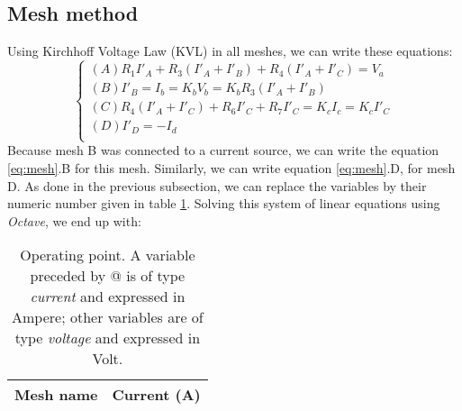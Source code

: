 \subsection{Mesh method}
Using Kirchhoff Voltage Law (KVL) in all meshes, we can write these equations:
\begin{equation}\label{eq:mesh}
\begin{cases}
  (A) R_1I'_A + R_3(I'_A + I'_B) + R_4(I'_A + I'_C) = V_a \\
  (B) I'_B = I_b = K_bV_b = K_bR_3(I'_A + I'_B) \\
  (C) R_4(I'_A+I'_C) + R_6I'_C + R_7I'_C = K_cI_c = K_cI'_C \\
  (D) I'_D = -I_d \\
\end{cases}
\end{equation}
Because mesh B was connected to a current source, we can write the equation \ref{eq:mesh}.B for this mesh. Similarly, we can write equation \ref{eq:mesh}.D, for mesh D. As done in the previous subsection, we can replace the variables by their numeric number given in table \ref{tab:mesh}. Solving this system of linear equations using \textit{Octave}, we end up with:
\begin{table}[h]
  \centering
  \begin{tabular}{|l|r|}
    \hline
        {\bf Mesh name} & {\bf Current (A)} \\ \hline
        
  \end{tabular}
  \caption{Operating point. A variable preceded by @ is of type {\em current}
   and expressed in Ampere; other variables are of type {\it voltage} and expressed in
    Volt.}
  \label{tab:mesh}
\end{table}
\par



